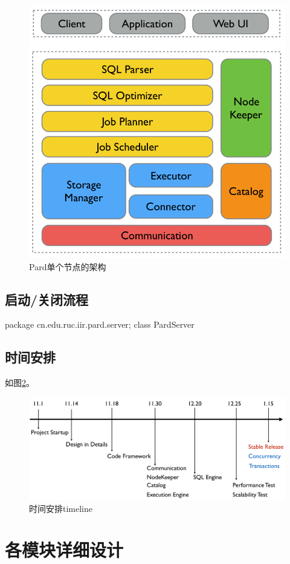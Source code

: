 \documentclass[a4paper, 12pt]{ctexart}
\begin{document}
\begin{figure}[htbp]
	\centering
	\includegraphics[width=0.7\linewidth]{figure/pard-node-in.png}
	\caption{Pard单个节点的架构}
	\label{fig:node1}
\end{figure}

\subsection{启动/关闭流程}
package cn.edu.ruc.iir.pard.server;
class PardServer

\subsection{时间安排}
如图\ref{fig:tl}。

\begin{figure}[htbp]
	\centering
	\includegraphics[width=\linewidth]{figure/timeline.png}
	\caption{时间安排timeline}
	\label{fig:tl}
\end{figure}




\section{各模块详细设计}
\end{document}

